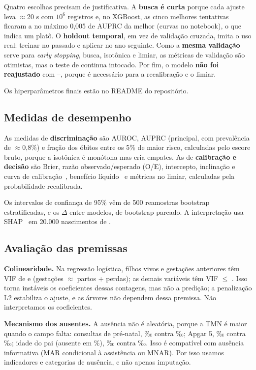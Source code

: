 \documentclass[12pt]{article}
\begin{document}
Quatro escolhas precisam de justificativa. A \textbf{busca é curta} porque cada ajuste leva $\approx$20 s com $10^6$ registros e, no XGBoost, as cinco melhores tentativas ficaram a no máximo 0,005 de AUPRC da melhor (curvas no notebook), o que indica um platô. O \textbf{holdout temporal}, em vez de validação cruzada, imita o uso real: treinar no passado e aplicar no ano seguinte. Como a \textbf{mesma validação} serve para \textit{early stopping}, busca, isotônica e limiar, as métricas de validação são otimistas, mas o teste de \anoTeste{} continua intocado. Por fim, o modelo \textbf{não foi reajustado} com \anoIni--\anoValid, porque \anoValid{} é necessário para a recalibração e o limiar.

Os hiperparâmetros finais estão no README do repositório.

\subsection{Medidas de desempenho}

As medidas de \textbf{discriminação} são AUROC, AUPRC (principal, com prevalência de $\approx$0,8\%) e fração dos óbitos entre os 5\% de maior risco, calculadas pelo escore bruto, porque a isotônica é monótona mas cria empates. As de \textbf{calibração e decisão} são Brier, razão observado/esperado (O/E), intercepto, inclinação e curva de calibração~\cite{vancalster2019}, benefício líquido~\cite{vickers2006} e métricas no limiar, calculadas pela probabilidade recalibrada.

Os intervalos de confiança de 95\% vêm de 500 reamostras bootstrap estratificadas, e os $\Delta$ entre modelos, de bootstrap pareado. A interpretação usa SHAP~\cite{lundberg2017} em 20.000 nascimentos de \anoTeste{}.

\subsection{Avaliação das premissas}

\textbf{Colinearidade.} Na regressão logística, filhos vivos e gestações anteriores têm VIF de \vifFilhos{} e \vifGest{} (gestações $\approx$ partos + perdas); as demais variáveis têm VIF $\leq$ \vifOutrosMax{}. Isso torna instáveis os coeficientes dessas contagens, mas não a predição; a penalização L2 estabiliza o ajuste, e as árvores não dependem dessa premissa. Não interpretamos os coeficientes.

\textbf{Mecanismo dos ausentes.} A ausência não é aleatória, porque a TMN é maior quando o campo falta: consultas de pré-natal, \ausCons{}‰ contra \preCons{}‰; Apgar 5, \ausApg{}‰ contra \preApg{}‰; idade do pai (ausente em \pctAusPai{}\%), \ausPai{}‰ contra \prePai{}‰. Isso é compatível com ausência informativa (MAR condicional à assistência ou MNAR). Por isso usamos indicadores e categorias de ausência, e não apenas imputação.
\end{document}
